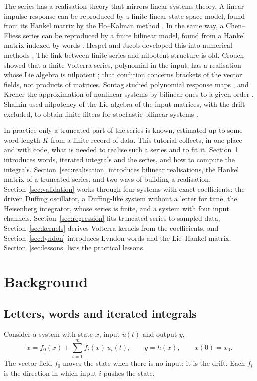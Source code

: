 \documentclass[11pt,a4paper]{article}
\theoremstyle{remark}
\begin{document}
The series has a realisation theory that mirrors linear systems theory.
A linear impulse response can be reproduced by a finite linear state-space model, found from its Hankel matrix by the Ho--Kalman method \cite{Kalman1963,HoKalman1966}.
In the same way, a Chen--Fliess series can be reproduced by a finite bilinear model, found from a Hankel matrix indexed by words \cite{Fliess1974,Schutzenberger1961,Isidori1973,DAlessandroIsidoriRuberti1974}.
Hespel and Jacob developed this into numerical methods \cite{HespelJacob1991,HespelJacob1998}.
The link between finite series and nilpotent structure is old.
Crouch showed that a finite Volterra series, polynomial in the input, has a realisation whose Lie algebra is nilpotent \cite{Crouch1981}; that condition concerns brackets of the vector fields, not products of matrices.
Sontag studied polynomial response maps \cite{Sontag1979}, and Krener the approximation of nonlinear systems by bilinear ones to a given order \cite{Krener1975}.
Shaikin used nilpotency of the Lie algebra of the input matrices, with the drift excluded, to obtain finite filters for stochastic bilinear systems \cite{Shaikin2004}.

In practice only a truncated part of the series is known, estimated up to some word length $K$ from a finite record of data.
This tutorial collects, in one place and with code, what is needed to realise such a series and to fit it.
Section~\ref{sec:background} introduces words, iterated integrals and the series, and how to compute the integrals.
Section~\ref{sec:realisation} introduces bilinear realisations, the Hankel matrix of a truncated series, and two ways of building a realisation.
Section~\ref{sec:validation} works through four systems with exact coefficients: the driven Duffing oscillator, a Duffing-like system without a letter for time, the Heisenberg integrator, whose series is finite, and a system with four input channels.
Section~\ref{sec:regression} fits truncated series to sampled data, Section~\ref{sec:kernels} derives Volterra kernels from the coefficients, and Section~\ref{sec:lyndon} introduces Lyndon words and the Lie--Hankel matrix.
Section~\ref{sec:lessons} lists the practical lessons.

\section{Background}\label{sec:background}
\subsection{Letters, words and iterated integrals}
Consider a system with state $x$, input $u(t)$ and output $y$,
\begin{equation}\label{eq:system}
\dot x=f_0(x)+\sum_{i=1}^m f_i(x)\,u_i(t),\qquad y=h(x),\qquad x(0)=x_0 .
\end{equation}
The vector field $f_0$ moves the state when there is no input; it is the drift.
Each $f_i$ is the direction in which input $i$ pushes the state.
\end{document}
